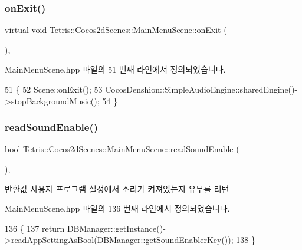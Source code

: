 \subsubsection{\texorpdfstring{on\+Exit()}{onExit()}}
{\footnotesize\ttfamily virtual void Tetris\+::\+Cocos2d\+Scenes\+::\+Main\+Menu\+Scene\+::on\+Exit (\begin{DoxyParamCaption}{ }\end{DoxyParamCaption})\hspace{0.3cm}{\ttfamily [inline]}, {\ttfamily [virtual]}}



Main\+Menu\+Scene.\+hpp 파일의 51 번째 라인에서 정의되었습니다.


\begin{DoxyCode}
51                          \{
52         Scene::onExit();
53         CocosDenshion::SimpleAudioEngine::sharedEngine()->stopBackgroundMusic();
54     \}
\end{DoxyCode}
\mbox{\label{class_tetris_1_1_cocos2d_scenes_1_1_main_menu_scene_a0454c0398dc84b0c8f9e1b3ff72da69d}} 
\subsubsection{\texorpdfstring{read\+Sound\+Enable()}{readSoundEnable()}}
{\footnotesize\ttfamily bool Tetris\+::\+Cocos2d\+Scenes\+::\+Main\+Menu\+Scene\+::read\+Sound\+Enable (\begin{DoxyParamCaption}{ }\end{DoxyParamCaption})\hspace{0.3cm}{\ttfamily [inline]}, {\ttfamily [protected]}}

\begin{DoxyReturn}{반환값}
사용자 프로그램 설정에서 소리가 켜져있는지 유무를 리턴 
\end{DoxyReturn}


Main\+Menu\+Scene.\+hpp 파일의 136 번째 라인에서 정의되었습니다.


\begin{DoxyCode}
136                           \{
137         \textcolor{keywordflow}{return} DBManager::getInstance()->readAppSettingAsBool(DBManager::getSoundEnablerKey());
138     \}
\end{DoxyCode}


